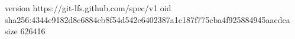 version https://git-lfs.github.com/spec/v1
oid sha256:4344e9182d8c6884cb8f54d542e6402387a1c187f775cba4f925884945aacdca
size 626416
